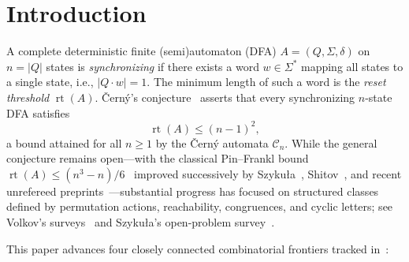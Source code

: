 \documentclass[11pt,a4paper]{article}
\theoremstyle{definition}
\theoremstyle{remark}
\newcommand{\rt}{\operatorname{rt}}
\begin{document}
\section{Introduction}

A complete deterministic finite (semi)automaton (DFA) $A = (Q, \Sigma, \delta)$ on $n = |Q|$ states is \emph{synchronizing} if there exists a word $w \in \Sigma^*$ mapping all states to a single state, i.e., $|Q \cdot w| = 1$. The minimum length of such a word is the \emph{reset threshold} $\rt(A)$. \v{C}ern\'y's conjecture~\cite{Cerny1964,Starke1966} asserts that every synchronizing $n$-state DFA satisfies
\[
  \rt(A) \le (n - 1)^2,
\]
a bound attained for all $n \ge 1$ by the \v{C}ern\'y automata $\mathcal{C}_n$. While the general conjecture remains open---with the classical Pin--Frankl bound $\rt(A) \le (n^3 - n)/6$~\cite{Frankl1982,Pin1983} improved successively by Szyku\l a~\cite{Szykula2018}, Shitov~\cite{Shitov2019}, and recent unrefereed preprints~\cite{Hong2026a,Hong2026b}---substantial progress has focused on structured classes defined by permutation actions, reachability, congruences, and cyclic letters; see Volkov's surveys~\cite{Volkov2022,Volkov2026} and Szyku\l a's open-problem survey~\cite{Szykula2026}.

This paper advances four closely connected combinatorial frontiers tracked in~\cite{Volkov2026}:
\end{document}
